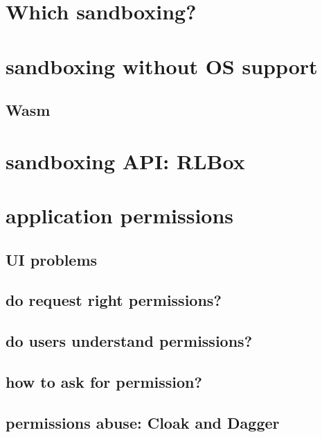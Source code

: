 \section{Which sandboxing?}


\section{sandboxing without OS support}


\subsection{Wasm}



\section{sandboxing API: RLBox}


\section{application permissions}


\subsection{UI problems}


\subsection{do request right permissions?}


\subsection{do users understand permissions?}


\subsection{how to ask for permission?}


\subsection{permissions abuse: Cloak and Dagger}


